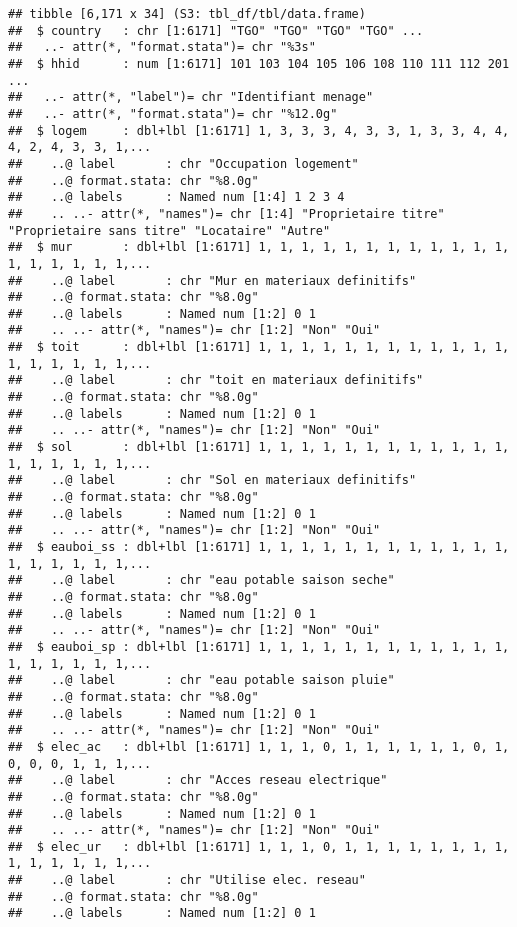 \documentclass[
]{article}
\begin{document}
\begin{verbatim}
## tibble [6,171 x 34] (S3: tbl_df/tbl/data.frame)
##  $ country   : chr [1:6171] "TGO" "TGO" "TGO" "TGO" ...
##   ..- attr(*, "format.stata")= chr "%3s"
##  $ hhid      : num [1:6171] 101 103 104 105 106 108 110 111 112 201 ...
##   ..- attr(*, "label")= chr "Identifiant menage"
##   ..- attr(*, "format.stata")= chr "%12.0g"
##  $ logem     : dbl+lbl [1:6171] 1, 3, 3, 3, 4, 3, 3, 1, 3, 3, 4, 4, 4, 2, 4, 3, 3, 1,...
##    ..@ label       : chr "Occupation logement"
##    ..@ format.stata: chr "%8.0g"
##    ..@ labels      : Named num [1:4] 1 2 3 4
##    .. ..- attr(*, "names")= chr [1:4] "Proprietaire titre" "Proprietaire sans titre" "Locataire" "Autre"
##  $ mur       : dbl+lbl [1:6171] 1, 1, 1, 1, 1, 1, 1, 1, 1, 1, 1, 1, 1, 1, 1, 1, 1, 1,...
##    ..@ label       : chr "Mur en materiaux definitifs"
##    ..@ format.stata: chr "%8.0g"
##    ..@ labels      : Named num [1:2] 0 1
##    .. ..- attr(*, "names")= chr [1:2] "Non" "Oui"
##  $ toit      : dbl+lbl [1:6171] 1, 1, 1, 1, 1, 1, 1, 1, 1, 1, 1, 1, 1, 1, 1, 1, 1, 1,...
##    ..@ label       : chr "toit en materiaux definitifs"
##    ..@ format.stata: chr "%8.0g"
##    ..@ labels      : Named num [1:2] 0 1
##    .. ..- attr(*, "names")= chr [1:2] "Non" "Oui"
##  $ sol       : dbl+lbl [1:6171] 1, 1, 1, 1, 1, 1, 1, 1, 1, 1, 1, 1, 1, 1, 1, 1, 1, 1,...
##    ..@ label       : chr "Sol en materiaux definitifs"
##    ..@ format.stata: chr "%8.0g"
##    ..@ labels      : Named num [1:2] 0 1
##    .. ..- attr(*, "names")= chr [1:2] "Non" "Oui"
##  $ eauboi_ss : dbl+lbl [1:6171] 1, 1, 1, 1, 1, 1, 1, 1, 1, 1, 1, 1, 1, 1, 1, 1, 1, 1,...
##    ..@ label       : chr "eau potable saison seche"
##    ..@ format.stata: chr "%8.0g"
##    ..@ labels      : Named num [1:2] 0 1
##    .. ..- attr(*, "names")= chr [1:2] "Non" "Oui"
##  $ eauboi_sp : dbl+lbl [1:6171] 1, 1, 1, 1, 1, 1, 1, 1, 1, 1, 1, 1, 1, 1, 1, 1, 1, 1,...
##    ..@ label       : chr "eau potable saison pluie"
##    ..@ format.stata: chr "%8.0g"
##    ..@ labels      : Named num [1:2] 0 1
##    .. ..- attr(*, "names")= chr [1:2] "Non" "Oui"
##  $ elec_ac   : dbl+lbl [1:6171] 1, 1, 1, 0, 1, 1, 1, 1, 1, 1, 0, 1, 0, 0, 0, 1, 1, 1,...
##    ..@ label       : chr "Acces reseau electrique"
##    ..@ format.stata: chr "%8.0g"
##    ..@ labels      : Named num [1:2] 0 1
##    .. ..- attr(*, "names")= chr [1:2] "Non" "Oui"
##  $ elec_ur   : dbl+lbl [1:6171] 1, 1, 1, 0, 1, 1, 1, 1, 1, 1, 1, 1, 1, 1, 1, 1, 1, 1,...
##    ..@ label       : chr "Utilise elec. reseau"
##    ..@ format.stata: chr "%8.0g"
##    ..@ labels      : Named num [1:2] 0 1

\end{verbatim}
\end{document}
